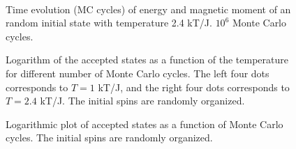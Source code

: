 \documentclass{emulateapj}
\begin{document}
\begin{figure}[h]
\\
\caption{Time evolution (MC cycles) of energy and magnetic moment of an random initial state with temperature 2.4 kT/J. $10^6$ Monte Carlo cycles.}
\end{figure}

\begin{figure}[h]
\mbox{}
\caption{Logarithm of the accepted states as a function of the temperature for different number of Monte Carlo cycles. The left four dots corresponds to $T=1$ kT/J, and the right four dots corresponds to $T=2.4$ kT/J. The initial spins are randomly organized.}
\label{fig:logAccepts(t)}
\end{figure}

\begin{figure}[h]
\mbox{}
\caption{Logarithmic plot of accepted states as a function of Monte Carlo cycles. The initial spins are randomly organized.}
\label{fig:logAccepts}
\end{figure}
\end{document}
